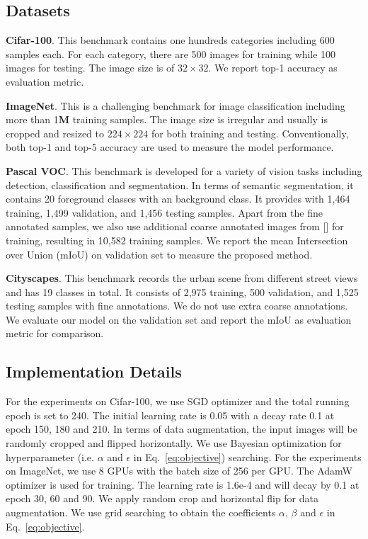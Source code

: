 \documentclass[10pt,twocolumn,letterpaper]{article}
\begin{document}
\subsection{Datasets}
\textbf{Cifar-100}. This benchmark contains one hundreds categories including 600 samples each. For each category, there are 500 images for training while 100 images for testing. The image size is of $32\times 32$. We report top-1 accuracy as evaluation metric.   

\textbf{ImageNet}. This is a challenging benchmark for image classification including more than 1\textbf{M} training samples. The image size is irregular and usually is cropped and resized to $224\times224$ for both training and testing. Conventionally, both top-1 and top-5 accuracy are used to measure the model performance.

\textbf{Pascal VOC}. This benchmark is developed for a variety of vision tasks including detection, classification and segmentation. In terms of semantic segmentation, it contains 20 foreground classes with an background class. It provides with 1,464 training, 1,499 validation, and 1,456 testing samples. Apart from the fine annotated samples, we also use additional coarse annotated images from [] for training, resulting in 10,582 training samples. We report the mean Intersection over Union (mIoU) on validation set to measure the proposed method.

\textbf{Cityscapes}. This benchmark records the urban scene from different street views and has 19 classes in total. It consists of 2,975 training, 500 validation, and 1,525 testing samples with fine annotations. We do not use extra coarse annotations. We evaluate our model on the validation set and report the mIoU as evaluation metric for comparison.

\subsection{Implementation Details}
For the experiments on Cifar-100, we use SGD optimizer \cite{sutskever2013importance} and the total running epoch is set to 240. The initial learning rate is 0.05 with a decay rate 0.1 at epoch 150, 180 and 210. In terms of data augmentation, the input images will be randomly cropped and flipped horizontally. We use Bayesian optimization for hyperparameter (i.e. $\alpha$ and $\epsilon$ in Eq.~\ref{eq:objective}) searching.
For the experiments on ImageNet, we use 8 GPUs with the batch size of 256 per GPU. The AdamW optimizer \cite{loshchilov2017decoupled} is used for training. The learning rate is 1.6e-4 and will decay by 0.1 at epoch 30, 60 and 90. We apply random crop and horizontal flip for data augmentation. We use grid searching to obtain the coefficients $\alpha$, $\beta$ and $\epsilon$ in Eq.~\ref{eq:objective}.
\end{document}
